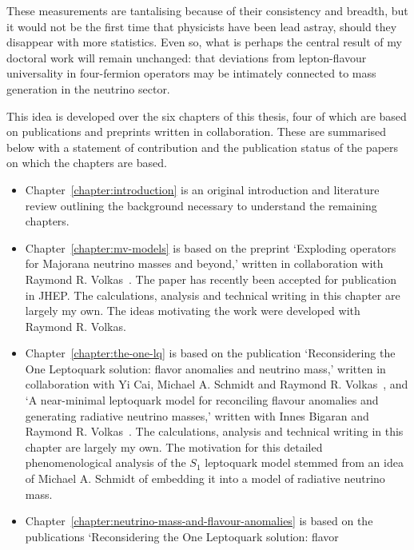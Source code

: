 \begin{preface}
  These measurements are tantalising because of their consistency and breadth,
  but it would not be the first time that physicists have been lead astray,
  should they disappear with more statistics. Even so, what is perhaps the
  central result of my doctoral work will remain unchanged: that deviations from
  lepton-flavour universality in four-fermion operators may be intimately
  connected to mass generation in the neutrino sector.

  This idea is developed over the six chapters of this thesis, four of which are
  based on publications and preprints written in collaboration. These are
  summarised below with a statement of contribution and the publication status
  of the papers on which the chapters are based.
  \begin{itemize}
    \item Chapter~\ref{chapter:introduction} is an original introduction and
          literature review outlining the background necessary to understand the
          remaining chapters.
    \item Chapter~\ref{chapter:mv-models} is based on the preprint `Exploding
          operators for Majorana neutrino masses and beyond,' written in
          collaboration with Raymond R. Volkas~\cite{Gargalionis:2020xvt}. The
          paper has recently been accepted for publication in JHEP. The
          calculations, analysis and technical writing in this chapter are
          largely my own. The ideas motivating the work were developed with
          Raymond R. Volkas.
    \item Chapter~\ref{chapter:the-one-lq} is based on the publication
          `Reconsidering the One Leptoquark solution: flavor anomalies and
          neutrino mass,' written in collaboration with Yi Cai, Michael A.
          Schmidt and Raymond R. Volkas~\cite{Cai:2017wry}, and `A near-minimal
          leptoquark model for reconciling flavour anomalies and generating
          radiative neutrino masses,' written with Innes Bigaran and Raymond R.
          Volkas~\cite{Bigaran:2019bqv}. The calculations, analysis and
          technical writing in this chapter are largely my own. The motivation
          for this detailed phenomenological analysis of the $S_{1}$ leptoquark
          model stemmed from an idea of Michael A. Schmidt of embedding it into
          a model of radiative neutrino mass.
    \item Chapter~\ref{chapter:neutrino-mass-and-flavour-anomalies} is based on
          the publications `Reconsidering the One Leptoquark solution: flavor

\end{itemize}
\end{preface}
